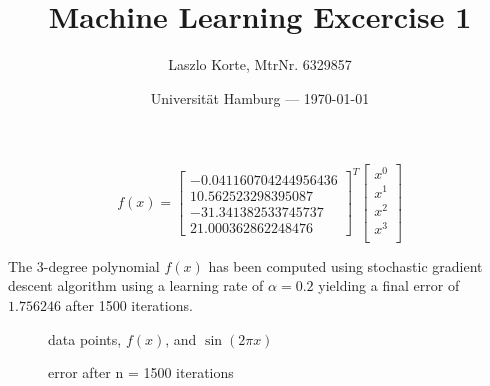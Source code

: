 \documentclass[parskip=half,a4paper]{scrartcl}
\title{Machine Learning Excercise 1}
\author{Laszlo Korte, MtrNr. 6329857}
\date{Universität Hamburg --- \today}
\begin{document}
\maketitle


$$
f(x) = \begin{bmatrix}
-0.041160704244956436 \\
10.562523298395087 \\
-31.341382533745737  \\
21.000362862248476
\end{bmatrix}^T
\begin{bmatrix}
x^0 \\
x^1 \\
x^2 \\
x^3 \\
\end{bmatrix}
$$


The 3-degree polynomial $f(x)$ has been computed using stochastic gradient descent algorithm using a learning rate of $\alpha = 0.2$ yielding a final error of $1.756246$ after 1500 iterations.

\begin{figure}[H]
\begin{center}
\scalebox{.7}{}
\caption{data points, $f(x)$, and $\sin(2\pi x)$}
\end{center}
\end{figure}

\begin{figure}[H]
\begin{center}
\scalebox{.7}{}
\caption{error after n = 1500 iterations}
\end{center}
\end{figure}
\end{document}
